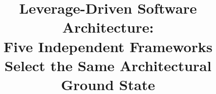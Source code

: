 \documentclass[11pt]{article}
\title{Leverage-Driven Software Architecture:\\Five Independent Frameworks Select the Same Architectural Ground State}
\begin{document}
\maketitle
\pentalogyfooter


\begin{abstract}

\end{abstract}

















\end{document}
